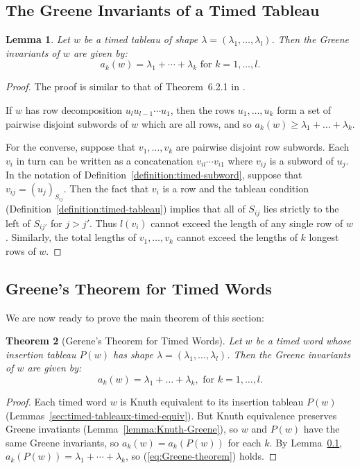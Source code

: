 \documentclass[12pt]{amsart}
\newtheorem{theorem}{Theorem}[subsection]
\newtheorem{lemma}[theorem]{Lemma}
\theoremstyle{definition}
\begin{document}
\subsection{The Greene Invariants of a Timed Tableau}
\label{sec:greene-invar-timed}
\begin{lemma}
  Let $w$ be a timed tableau of shape $\lambda=(\lambda_1,\dotsc,\lambda_l)$.
  Then the Greene invariants of $w$ are given by:
  \begin{displaymath}
    a_k(w) = \lambda_1+\dotsb +\lambda_k \text{ for } k=1,\dotsc,l.
  \end{displaymath}
\end{lemma}
\begin{proof}
  The proof is similar to that of Theorem~6.2.1 in \cite{Lascoux}.

  If $w$ has row decomposition $u_lu_{l-1}\dotsb u_1$, then the rows $u_1,\dotsc,u_k$ form a set of pairwise disjoint subwords of $w$ which are all rows, and so $a_k(w)\geq \lambda_1+\dotsc+\lambda_k$.

  For the converse, suppose that $v_1,\dotsc, v_k$ are pairwise disjoint row subwords.
  Each $v_i$ in turn can be written as a concatenation $v_{il}\dotsb v_{i1}$ where $v_{ij}$ is a subword of $u_j$.
  In the notation of Definition~\ref{definition:timed-subword}, suppose that $v_{ij}=(u_j)_{S_{ij}}$.
  Then the fact that $v_i$ is a row and the tableau condition (Definition~\ref{definition:timed-tableau}) implies that all of $S_{ij}$ lies strictly to the left of $S_{ij'}$ for $j>j'$.
  Thus $l(v_i)$ cannot exceed the length of any single row of $w$.
  Similarly, the total lengths of $v_1,\dotsc, v_k$ cannot exceed the lengths of $k$ longest rows of $w$.
\end{proof}
\subsection{Greene's Theorem for Timed Words}
\label{sec:green-theor-timed}
We are now ready to prove the main theorem of this section:
\begin{theorem}
  [Gerene's Theorem for Timed Words]
  \label{theorem:timed-Greene}
  Let $w$ be a timed word whose insertion tableau $P(w)$ has shape $\lambda=(\lambda_1,\dotsc,\lambda_l)$.
  Then the Greene invariants of $w$ are given by:
  \begin{equation}
    \label{eq:Greene-theorem}
    a_k(w) = \lambda_1+\dotsc+\lambda_k, \text{ for } k=1,\dotsc, l.
  \end{equation}
\end{theorem}
\begin{proof}
  Each timed word $w$ is Knuth equivalent to its insertion tableau $P(w)$ (Lemmas~\ref{sec:timed-tableaux-timed-equiv}).
  But Knuth equivalence preserves Greene invatiants (Lemma~\ref{lemma:Knuth-Greene}), so $w$ and $P(w)$ have the same Greene invariants, so $a_k(w)=a_k(P(w))$ for each $k$.
  By Lemma~\ref{sec:greene-invar-timed}, $a_k(P(w)) = \lambda_1+\dotsb + \lambda_k$, so (\ref{eq:Greene-theorem}) holds.
\end{proof}
\end{document}

